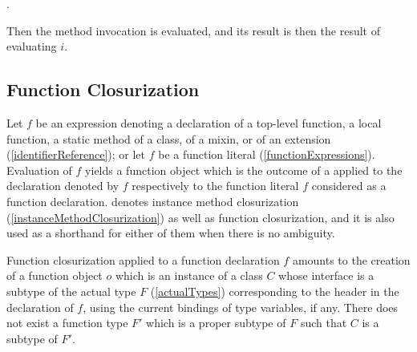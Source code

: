 \documentclass[makeidx]{article}
\begin{document}
{\begin{itemize}
  .
\end{itemize}

\LMHash{}%
Then the method invocation  is evaluated,
and its result is then the result of evaluating $i$.



\subsection{Function Closurization}

\LMHash{}%
Let $f$ be an expression denoting
a declaration of a top-level function, a local function,
a static method of a class, of a mixin, or of an extension
(\ref{identifierReference});
or let $f$ be a function literal
(\ref{functionExpressions}).
Evaluation of $f$ yields a function object
which is the outcome of a 
applied to the declaration denoted by $f$
respectively to the function literal $f$ considered as a function declaration.
denotes instance method closurization
(\ref{instanceMethodClosurization})
as well as function closurization,
and it is also used as a shorthand for either of them
when there is no ambiguity.

\LMHash{}%
Function closurization applied to a function declaration $f$
amounts to the creation of a function object $o$
which is an instance of a class $C$ whose interface is
a subtype of the actual type $F$
(\ref{actualTypes})
corresponding to the header in the declaration of $f$,
using the current bindings of type variables, if any.
There does not exist a function type $F'$ which is a proper subtype of $F$
such that $C$ is a subtype of $F'$.


}
\end{document}
